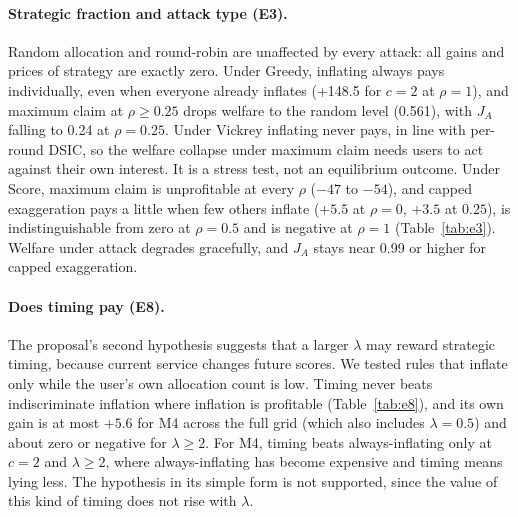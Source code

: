 \documentclass{article}
\theoremstyle{plain}
\theoremstyle{definition}
\newcommand{\JA}{J_A}
\begin{document}
\paragraph{Strategic fraction and attack type (E3).}
Random allocation and round-robin are unaffected by every attack: all gains and prices of strategy are exactly zero.
Under Greedy, inflating always pays individually, even when everyone already inflates (+148.5 for $c=2$ at $\rho=1$), and maximum claim at $\rho\ge 0.25$ drops welfare to the random level (0.561), with $\JA$ falling to 0.24 at $\rho=0.25$.
Under Vickrey inflating never pays, in line with per-round DSIC, so the welfare collapse under maximum claim needs users to act against their own interest. It is a stress test, not an equilibrium outcome.
Under Score, maximum claim is unprofitable at every $\rho$ ($-47$ to $-54$), and capped exaggeration pays a little when few others inflate ($+5.5$ at $\rho=0$, $+3.5$ at $0.25$), is indistinguishable from zero at $\rho=0.5$ and is negative at $\rho=1$ (Table~\ref{tab:e3}).
Welfare under attack degrades gracefully, and $\JA$ stays near 0.99 or higher for capped exaggeration.



\paragraph{Does timing pay (E8).}
The proposal's second hypothesis suggests that a larger $\lambda$ may reward strategic timing, because current service changes future scores.
We tested rules that inflate only while the user's own allocation count is low.
Timing never beats indiscriminate inflation where inflation is profitable (Table~\ref{tab:e8}), and its own gain is at most $+5.6$ for M4 across the full grid (which also includes $\lambda=0.5$) and about zero or negative for $\lambda\ge 2$.
For M4, timing beats always-inflating only at $c=2$ and $\lambda\ge 2$, where always-inflating has become expensive and timing means lying less.
The hypothesis in its simple form is not supported, since the value of this kind of timing does not rise with $\lambda$.


\end{document}
